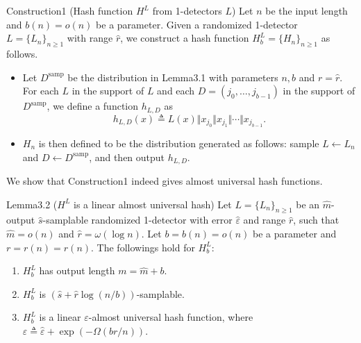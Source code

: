 \begin{authorclaim}{Construction1 (Hash function $H^L$ from 1-detectors $L$)}
Let $n$ be the input length and $b(n)=o(n)$ be a parameter. Given a randomized 1-detector $L=\{L_n\}_{n\ge1}$ with range $\hat r$, we construct a hash function $H_b^L=\{H_n\}_{n\ge1}$ as follows.
\begin{itemize}
\item Let $D^{\mathrm{samp}}$ be the distribution in Lemma3.1 with parameters $n,b$ and $r=\hat r$. For each $L$ in the support of $L$ and each $D=(j_0,\ldots,j_{b-1})$ in the support of $D^{\mathrm{samp}}$, we define a function $h_{L,D}$ as
\[h_{L,D}(x)\triangleq L(x)\Vert x_{j_0}\Vert x_{j_1}\Vert\cdots\Vert x_{j_{b-1}}.\]
\item $H_n$ is then defined to be the distribution generated as follows: sample $L\leftarrow L_n$ and $D\leftarrow D^{\mathrm{samp}}$, and then output $h_{L,D}$.
\end{itemize}
\end{authorclaim}
We show that Construction1 indeed gives almost universal hash functions.
\begin{authorclaim}{Lemma3.2 ($H^L$ is a linear almost universal hash)}
Let $L=\{L_n\}_{n\ge1}$ be an $\hat m$-output $\hat s$-samplable randomized 1-detector with error $\hat\varepsilon$ and range $\hat r$, such that $\hat m=o(n)$ and $\hat r=\omega(\log n)$. Let $b=b(n)=o(n)$ be a parameter and $r=r(n)=\hat r(n)$. The followings hold for $H_b^L$:
\begin{enumerate}
\item $H_b^L$ has output length $m=\hat m+b$.
\item $H_b^L$ is $(\hat s+\hat r\log(n/b))$-samplable.
\item $H_b^L$ is a linear $\varepsilon$-almost universal hash function, where $\varepsilon\triangleq\hat\varepsilon+\exp(-\Omega(br/n))$.
\end{enumerate}
\end{authorclaim}
